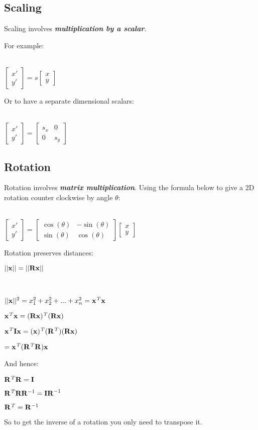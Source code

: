 \documentclass{article}
\begin{document}
\subsection{Scaling}
Scaling involves {\textbf{\textit{multiplication by a scalar}}}.

For example: \\~\\
\centerline{$
\begin{bmatrix}
x' \\ y'
\end{bmatrix}
= s 
\begin{bmatrix}
x \\ y
\end{bmatrix}$}

Or to have a separate dimensional scalars:\\ \\
\centerline{$
\begin{bmatrix}
x' \\ y'
\end{bmatrix} = 
\begin{bmatrix}
	s_x&0\\
	0&s_y
\end{bmatrix} $}
\subsection{Rotation}
Rotation involves {\textbf{\textit{matrix multiplication}}}. Using the formula below to give a 2D rotation counter clockwise by angle $\theta$:
\\~\\
\centerline{$
	\begin{bmatrix}
		x' \\ y'
	\end{bmatrix} = 
	\begin{bmatrix}
		\cos(\theta) & -\sin(\theta)\\
		\sin(\theta) & \cos(\theta)
	\end{bmatrix}
	\begin{bmatrix}
		x \\ y
	\end{bmatrix}
$}

Rotation preserves distances: \\
\centerline{$ ||{\bf x}|| = ||{\bf Rx}|| $}\\
\centerline{$||{\bf x}||^2 = x^2_1 + x^2_2 + ... + x^2_n = {\bf x}{\it ^T}{\bf x} $}
\centerline{${\bf x}{\it ^T}{\bf x} = ({\bf Rx}){\it ^T}({\bf Rx}) 
$}
\centerline{${\bf x}{\it ^T}{\bf Ix} = ({\bf x}){\it ^T}({\bf R}{\it ^T})({\bf Rx}) 	
$}
\centerline{$ = {\bf x}{\it ^T}({\bf R}{\it ^T}{\bf R}){\bf x}  
$}
And hence: \\ \centerline{$ {\bf R}{\it ^T}{\bf R} = {\bf I} $} 
\centerline{$ {\bf R}{\it ^T} {\bf R} {\bf R}^{-1} = {\bf IR}^{-1} $}    
\centerline{$ {\bf R}{\it ^T} = {\bf R}^{-1}  $}
So to get the inverse of a rotation you only need to transpose it.
\end{document}
